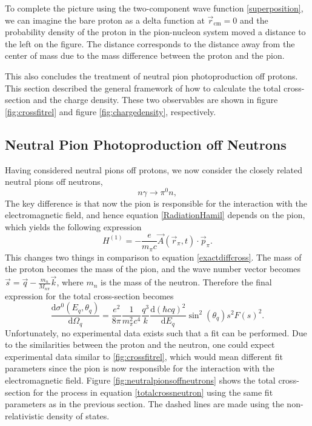 To complete the picture using the two-component wave function \eqref{superposition}, we can imagine the bare proton as a delta function at $\vec{r}_\text{cm}=0$ and the probability density of the proton in the pion-nucleon system moved a distance to the left on the figure. The distance corresponds to the distance away from the center of mass due to the mass difference between the proton and the pion. 

This also concludes the treatment of neutral pion photoproduction off protons. This section described the general framework of how to calculate the total cross-section and the charge density. These two observables are shown in figure \ref{fig:crossfitrel} and figure \ref{fig:chargedensity}, respectively.


\subsection{Neutral Pion Photoproduction off Neutrons}\label{sec:NoffN}
Having considered neutral pions off protons, we now consider the closely related neutral pions off neutrons,
\begin{equation} \label{process2}
	n\gamma \rightarrow \pi^0 n,
\end{equation}
The key difference is that now the pion is responsible for the interaction with the electromagnetic field, and hence equation \eqref{RadiationHamil} depends on the pion, which yields the following expression
\begin{equation} \label{RadiNeutron}
	H^{(1)} = -\frac{e}{m_\pi c}\vec{A}(\vec{r}_\pi,t)\cdot\vec{p}_\pi.
\end{equation}
This changes two things in comparison to equation \eqref{exactdiffcross}. The mass of the proton becomes the mass of the pion, and the wave number vector becomes $\vec{s}=\vec{q}-\frac{m_n}{M_{n\pi}}\vec{k}$, where $m_n$ is the mass of the neutron. Therefore the final expression for the total cross-section becomes 
\begin{equation} \label{totalcrossneutron}
	\frac{\text{d}\sigma^0(E_q,\theta_q)}{\text{d}\Omega_q} = \frac{e^2}{8\pi}\frac{1}{m_\pi^2c^4}\frac{q^3}{k}\frac{\text{d}(\hbar c q)^2}{\text{d}E_q}\sin^2(\theta_q) s^2 F(s)^2.
\end{equation}
Unfortunately, no experimental data exists such that a fit can be performed. Due to the similarities between the proton and the neutron, one could expect experimental data similar to \ref{fig:crossfitrel}, which would mean different fit parameters since the pion is now responsible for the interaction with the electromagnetic field. Figure \ref{fig:neutralpionsoffneutrons} shows the total cross-section for the process in equation \eqref{totalcrossneutron} using the same fit parameters as in the previous section. The dashed lines are made using the non-relativistic density of states.
